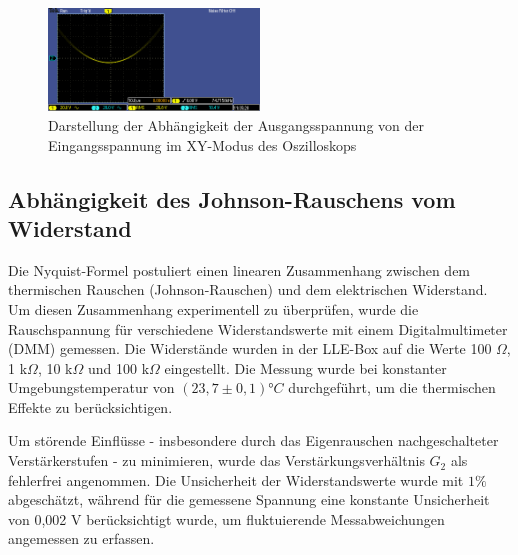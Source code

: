 \documentclass{article}
\begin{document}
\begin{figure}[htbp]
    \centering
    \includegraphics[width=0.5\textwidth]{figs/johnson parabel.png}
    \caption{Darstellung der Abhängigkeit der Ausgangsspannung von der Eingangsspannung im XY-Modus des Oszilloskops}
    \label{fig:parabel}
\end{figure}
\FloatBarrier
\subsection{Abhängigkeit des Johnson-Rauschens vom Widerstand}
Die Nyquist-Formel postuliert einen linearen Zusammenhang zwischen dem thermischen Rauschen (Johnson-Rauschen) und dem elektrischen Widerstand. Um diesen Zusammenhang experimentell zu überprüfen, wurde die Rauschspannung für verschiedene Widerstandswerte mit einem Digitalmultimeter (DMM) gemessen. Die Widerstände wurden in der LLE-Box auf die Werte 100 $\Omega$, 1 k$\Omega$, 10 k$\Omega$ und 100 k$\Omega$ eingestellt. Die Messung wurde bei konstanter Umgebungstemperatur von $(23,7 ± 0,1) °C$ durchgeführt, um die thermischen Effekte zu berücksichtigen.

Um störende Einflüsse - insbesondere durch das Eigenrauschen nachgeschalteter Verstärkerstufen - zu minimieren, wurde das Verstärkungsverhältnis $G_2$ als fehlerfrei angenommen. Die Unsicherheit der Widerstandswerte wurde mit $1\%$ abgeschätzt, während für die gemessene Spannung eine konstante Unsicherheit von 0,002 V berücksichtigt wurde, um fluktuierende Messabweichungen angemessen zu erfassen.
\end{document}
